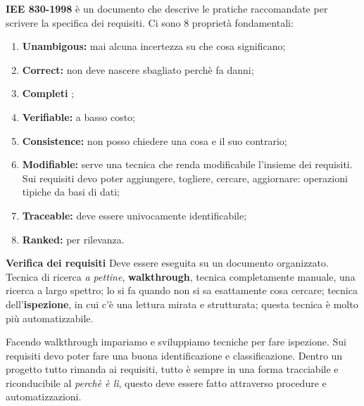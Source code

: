 \textbf{IEE 830-1998} è un documento che descrive le pratiche raccomandate per scrivere la specifica dei requisiti. Ci sono 8 proprietà fondamentali:

\begin{enumerate}

	\item \textbf{Unambigous:} mai alcuna incertezza su che cosa significano;
	\item \textbf{Correct:} non deve nascere sbagliato perchè fa danni;
	\item \textbf{Completi} ;
	\item \textbf{Verifiable:} a basso costo;
	\item \textbf{Consistence:} non posso chiedere una cosa e il suo contrario;
	\item \textbf{Modifiable:} serve una tecnica che renda modificabile l'insieme dei requisiti. Sui requisiti devo poter aggiungere, togliere, cercare, aggiornare: operazioni tipiche da basi di dati;
	\item \textbf{Traceable:} deve essere univocamente identificabile;
	\item \textbf{Ranked:} per rilevanza.

\end{enumerate}

\textbf{Verifica dei requisiti}
Deve essere eseguita su un documento organizzato. Tecnica di ricerca \textit{a pettine}, \textbf{walkthrough}, tecnica completamente manuale, una ricerca a largo spettro; lo si fa quando non si sa esattamente cosa cercare; tecnica dell'\textbf{ispezione}, in cui c'è una lettura mirata e strutturata; questa tecnica è molto più automatizzabile. 

Facendo walkthrough impariamo e sviluppiamo tecniche per fare ispezione. Sui requisiti devo poter fare una buona identificazione e classificazione. Dentro un progetto tutto rimanda ai requisiti, tutto è sempre in una forma tracciabile e riconducibile al \textit{perchè è lì}, questo deve essere fatto attraverso procedure e automatizzazioni.\\

